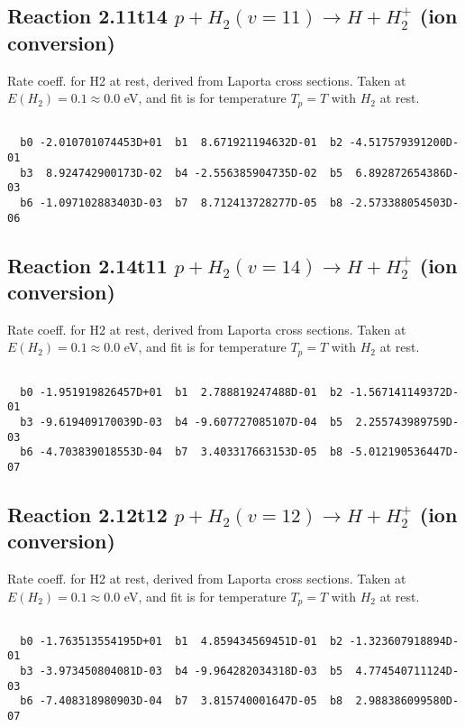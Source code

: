 \documentclass[12pt,dvipdfmx]{article}
\begin{document}
\newpage
\subsection{
Reaction 2.11t14
$ p + H_2(v=11) \rightarrow H + H_2^+$ (ion conversion)
}
Rate coeff. for H2 at rest, derived from Laporta cross sections.
Taken at $E(H_2) = 0.1 \approx 0.0$ eV,  and fit is for temperature $T_p=T$ with $H_2$ at rest.

\begin{small}\begin{verbatim}

  b0 -2.010701074453D+01  b1  8.671921194632D-01  b2 -4.517579391200D-01
  b3  8.924742900173D-02  b4 -2.556385904735D-02  b5  6.892872654386D-03
  b6 -1.097102883403D-03  b7  8.712413728277D-05  b8 -2.573388054503D-06

\end{verbatim}\end{small}

\newpage
\subsection{
Reaction 2.14t11
$ p + H_2(v=14) \rightarrow H + H_2^+$ (ion conversion)
}
Rate coeff. for H2 at rest, derived from Laporta cross sections.
Taken at $E(H_2) = 0.1 \approx 0.0$ eV,  and fit is for temperature $T_p=T$ with $H_2$ at rest.

\begin{small}\begin{verbatim}

  b0 -1.951919826457D+01  b1  2.788819247488D-01  b2 -1.567141149372D-01
  b3 -9.619409170039D-03  b4 -9.607727085107D-04  b5  2.255743989759D-03
  b6 -4.703839018553D-04  b7  3.403317663153D-05  b8 -5.012190536447D-07

\end{verbatim}\end{small}

\newpage
\subsection{
Reaction 2.12t12
$ p + H_2(v=12) \rightarrow H + H_2^+$ (ion conversion)
}
Rate coeff. for H2 at rest, derived from Laporta cross sections.
Taken at $E(H_2) = 0.1 \approx 0.0$ eV,  and fit is for temperature $T_p=T$ with $H_2$ at rest.

\begin{small}\begin{verbatim}

  b0 -1.763513554195D+01  b1  4.859434569451D-01  b2 -1.323607918894D-01
  b3 -3.973450804081D-03  b4 -9.964282034318D-03  b5  4.774540711124D-03
  b6 -7.408318980903D-04  b7  3.815740001647D-05  b8  2.988386099580D-07

\end{verbatim}\end{small}
\end{document}
